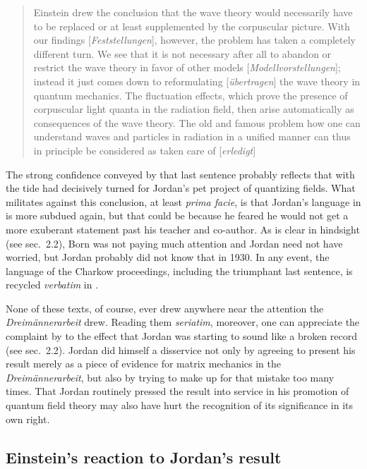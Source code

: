 \documentclass{elsart}
\begin{document}
\begin{quotation}
Einstein drew the conclusion that the wave theory would necessarily have to be replaced or at least supplemented by the corpuscular picture. With our findings [{\it Feststellungen}], however, the problem has taken a completely different turn. We see that it is not necessary after all to abandon or restrict the wave theory in favor of other models [{\it Modellvorstellungen}]; instead it just comes down to reformulating [{\it \"ubertragen}] the wave theory in quantum mechanics. The fluctuation effects, which prove the presence of corpuscular light quanta in the radiation field, then arise automatically as consequences of the wave theory.  The old and famous problem how one can understand waves and particles in radiation in a unified manner can thus in principle be considered as taken care of [{\it erledigt}] \citep[p.\ 702]{Jordan 1929} 
\end{quotation}
The strong confidence conveyed by that last sentence probably reflects that with \citep{Dirac 1927} the tide had decisively turned for Jordan's pet project of quantizing fields. What militates against this conclusion, at least {\it prima facie}, is that Jordan's language in \citep[pp.\ 398--399]{Born and Jordan 1930} is more subdued again, but that could be because he feared he would not get a  more exuberant statement past his teacher and co-author. As is clear in hindsight (see sec.\ 2.2), Born was not paying much attention and Jordan need not have worried, but Jordan probably did not know that in 1930. In any event, the language of the Charkow proceedings, including the triumphant last sentence,  is recycled {\it verbatim} in \citep[p.\ 222]{Jordan 1936}. 

None of these texts, of course, ever drew anywhere near the attention the {\it Dreim\"annerarbeit} drew. Reading them {\it seriatim}, moreover, one can appreciate the complaint by \citet{Pauli 1930}  to the effect that Jordan was starting to sound like a broken record (see sec.\ 2.2). Jordan did himself a disservice not only by agreeing to present his result merely as a piece of evidence for matrix mechanics in the {\it Dreim\"annerarbeit}, but also by trying to make up for that mistake too many times. That Jordan   routinely pressed the result into service in his promotion of quantum field theory may also have hurt the recognition of its significance in its own right. 

\subsection{Einstein's reaction to Jordan's result}
\end{document}
